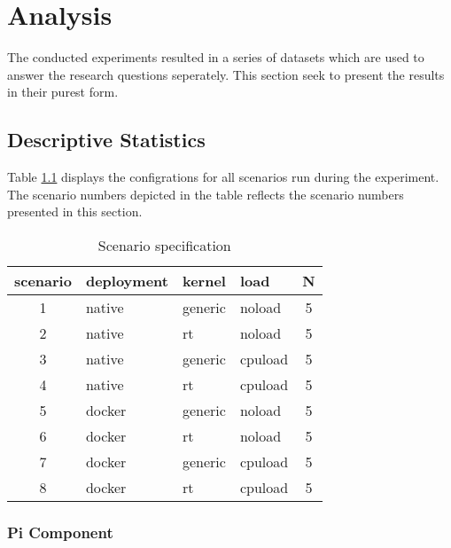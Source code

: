 \iffalse  \fi
\chapter{Analysis}

The conducted experiments resulted in a series of datasets which are used to answer the research questions seperately. This section seek to present the results in their purest form. 



\section{Descriptive Statistics}

Table \ref{tab:scen-table} displays the configrations for all scenarios run during the experiment. The scenario numbers depicted in the table reflects the scenario numbers presented in this section.

\begin{table}[H]
\centering
\caption{Scenario specification}
\label{tab:scen-table}
\begin{tabular}{|c|l|l|l|c|}
\hline
\textbf{scenario} & \textbf{deployment} & \textbf{kernel} & \textbf{load} & \textbf{N} \\ \hline
1                 & native              & generic         & noload        & 5        \\
2                 & native              & rt              & noload        & 5        \\
3                 & native              & generic         & cpuload       & 5        \\
4                 & native              & rt              & cpuload       & 5        \\
5                 & docker              & generic         & noload        & 5        \\
6                 & docker              & rt              & noload        & 5        \\
7                 & docker              & generic         & cpuload       & 5        \\
8                 & docker              & rt              & cpuload       & 5        \\ \hline
\end{tabular}
\end{table}


\subsection{Pi Component}


